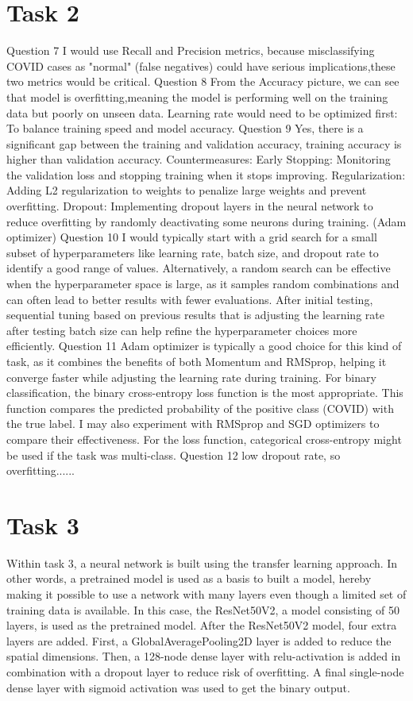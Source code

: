 \documentclass[conference]{IEEEtran}
\begin{document}
\section{Task 2}
Question 7
I would use Recall and Precision metrics, because misclassifying COVID cases as "normal" (false negatives) could have serious implications,these two metrics would be critical.
Question 8
From the Accuracy picture, we can see that model is overfitting,meaning the model is performing well on the training data but poorly on unseen data. Learning rate would need to be optimized first: To balance training speed and model accuracy.
Question 9
Yes, there is a significant gap between the training and validation accuracy, training accuracy is higher than validation accuracy.
Countermeasures:
Early Stopping: Monitoring the validation loss and stopping training when it stops improving.
Regularization: Adding L2 regularization to weights to penalize large weights and prevent overfitting.
Dropout: Implementing dropout layers in the neural network to reduce overfitting by randomly deactivating some neurons during training.
(Adam optimizer)
Question 10
I would typically start with a grid search for a small subset of hyperparameters like learning rate, batch size, and dropout rate to identify a good range of values.
Alternatively, a random search can be effective when the hyperparameter space is large, as it samples random combinations and can often lead to better results with fewer evaluations.
After initial testing, sequential tuning based on previous results that is adjusting the learning rate after testing batch size can help refine the hyperparameter choices more efficiently.
Question 11
Adam optimizer is typically a good choice for this kind of task, as it combines the benefits of both Momentum and RMSprop, helping it converge faster while adjusting the learning rate during training.
For binary classification, the binary cross-entropy loss function is the most appropriate. This function compares the predicted probability of the positive class (COVID) with the true label.
I may also experiment with RMSprop and SGD optimizers to compare their effectiveness.
For the loss function, categorical cross-entropy might be used if the task was multi-class.
Question 12
low dropout rate, so overfitting......


\section{Task 3}

Within task 3, a neural network is built using the transfer learning approach. In other words, a pretrained model is used as a basis to built a model, hereby making it possible to use a network with many layers even though a limited set of training data is available. 
In this case, the ResNet50V2, a model consisting of 50 layers, is used as the pretrained model. After the ResNet50V2 model, four extra layers are added. First, a GlobalAveragePooling2D layer is added to reduce the spatial dimensions. Then, a 128-node dense layer with relu-activation is added in combination with a dropout layer to reduce risk of overfitting. A final single-node dense layer with sigmoid activation was used to get the binary output.
\end{document}
